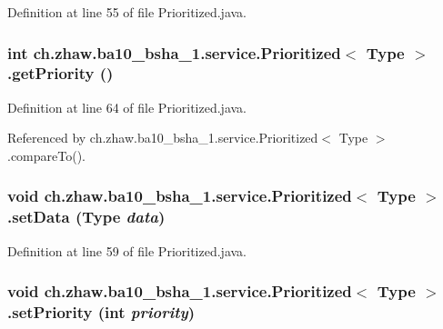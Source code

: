 Definition at line 55 of file Prioritized.java.\hypertarget{classch_1_1zhaw_1_1ba10__bsha__1_1_1service_1_1Prioritized_3_01Type_01_4_a10f654cdff9cc8fbdc4614b8994cf777}{
\subsubsection[{getPriority}]{\setlength{\rightskip}{0pt plus 5cm}int ch.zhaw.ba10\_\-bsha\_\-1.service.Prioritized$<$ Type $>$.getPriority ()}}
\label{classch_1_1zhaw_1_1ba10__bsha__1_1_1service_1_1Prioritized_3_01Type_01_4_a10f654cdff9cc8fbdc4614b8994cf777}


Definition at line 64 of file Prioritized.java.

Referenced by ch.zhaw.ba10\_\-bsha\_\-1.service.Prioritized$<$ Type $>$.compareTo().\hypertarget{classch_1_1zhaw_1_1ba10__bsha__1_1_1service_1_1Prioritized_3_01Type_01_4_a8ad6a5c7b6b3c485a38e976543b1d11c}{
\subsubsection[{setData}]{\setlength{\rightskip}{0pt plus 5cm}void ch.zhaw.ba10\_\-bsha\_\-1.service.Prioritized$<$ Type $>$.setData (Type {\em data})}}
\label{classch_1_1zhaw_1_1ba10__bsha__1_1_1service_1_1Prioritized_3_01Type_01_4_a8ad6a5c7b6b3c485a38e976543b1d11c}


Definition at line 59 of file Prioritized.java.\hypertarget{classch_1_1zhaw_1_1ba10__bsha__1_1_1service_1_1Prioritized_3_01Type_01_4_a845e2a103ad9ad90bcbd7c2af29883b9}{
\subsubsection[{setPriority}]{\setlength{\rightskip}{0pt plus 5cm}void ch.zhaw.ba10\_\-bsha\_\-1.service.Prioritized$<$ Type $>$.setPriority (int {\em priority})}}
\label{classch_1_1zhaw_1_1ba10__bsha__1_1_1service_1_1Prioritized_3_01Type_01_4_a845e2a103ad9ad90bcbd7c2af29883b9}


